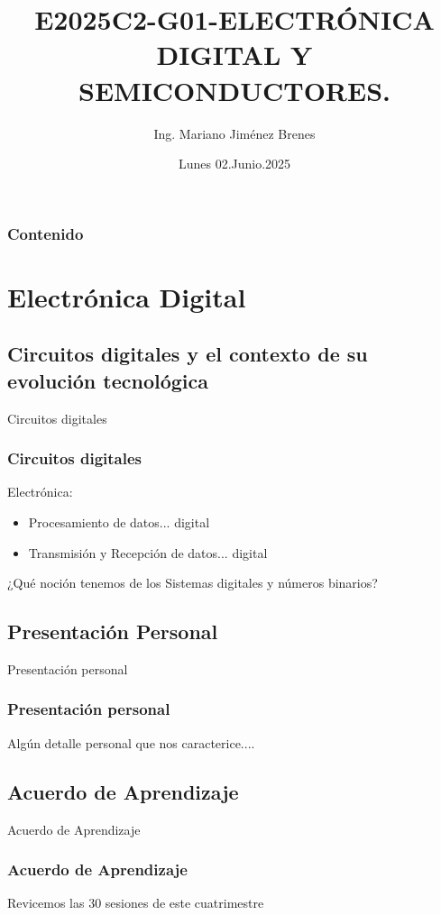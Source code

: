 \documentclass[11pt]{beamer}
\author{Ing. Mariano Jim\'enez Brenes}
\title
{ 
E2025C2-G01-ELECTRÓNICA DIGITAL Y SEMICONDUCTORES.
}
\institute{
Universidad Castro Carazo\linebreak
T\'ecnico En Semiconductores
}
\date{Lunes 02.Junio.2025}
\begin{document}
\begin{frame}
\maketitle 
\end{frame}

\logo{}

\begin{frame}
\frametitle{Contenido}
\tableofcontents
\end{frame}


\section{Electr\'onica Digital}
\subsection{Circuitos digitales y el
contexto de su evoluci\'on
tecnol\'ogica}
\begin{frame}{Circuitos digitales}
\frametitle{Circuitos digitales}
Electr\'onica:
	\begin{itemize}
		\item Procesamiento de datos... digital
		\item Transmisi\'on y Recepci\'on de datos... digital
	\end{itemize}
	¿Qu\'e noci\'on tenemos de los Sistemas digitales y n\'umeros binarios?
\end{frame}
\subsection{Presentaci\'on Personal}
\begin{frame}{Presentaci\'on personal}
\frametitle{Presentaci\'on personal}
Alg\'un detalle personal que nos caracterice....
\end{frame}
\subsection{Acuerdo de Aprendizaje}
\begin{frame}{Acuerdo de Aprendizaje}
\frametitle{Acuerdo de Aprendizaje}
Revicemos las 30 sesiones de este cuatrimestre
\end{frame}
\end{document}
